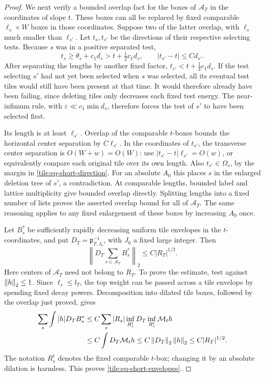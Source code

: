 \begin{proof}
We next verify a bounded overlap fact for the boxes of
\(\mathcal A_T\) in the coordinates of slope \(t\).  These
boxes can all be replaced by fixed comparable
\(\ell_s\times W\) boxes in those coordinates.  Suppose
two of the latter overlap, with \(\ell_s\) much smaller
than \(\ell_{s'}\).  Let \(t_s,t_{s'}\) be the directions
of their respective selecting tests.  Because \(s\) was
in a positive separated test,
\[
 t_s\geq\theta_s+c_1d_s>t+\tfrac12c_1d_s,
 \qquad
 |t_{s'}-t|\leq C d_{s'}.
\]
After separating the lengths by another fixed factor,
\(t_{s'}<t+\tfrac14c_1d_s\).  If the test selecting
\(s'\) had not yet been selected when \(s\) was selected,
all its eventual test tiles would still have been
present at that time.  It would therefore already
have been failing, since deleting tiles only
decreases each fixed test energy.
The near-infimum rule, with
\(\varepsilon\ll c_1\min d_s\), therefore forces the
test of \(s'\) to have been selected first.

Its length is at least \(\ell_{s'}\).  Overlap of the
comparable \(t\)-boxes bounds the horizontal center
separation by \(C\ell_{s'}\).  In the coordinates of
\(t_{s'}\), the transverse center separation is
\(O(W+w)=O(W)\): use
\(|t_{s'}-t|\ell_{s'}=O(w)\), or equivalently compare
each original tile over its own length.  Also
\(t_{s'}\in\Omega_s\), by the margin in
\eqref{tile:eq-short-direction}.  For an absolute
\(A_0\) this places \(s\) in the enlarged deletion tree
of \(s'\), a contradiction.  At comparable lengths,
bounded label and lattice multiplicity give bounded
overlap directly.  Splitting lengths into a fixed number
of lists proves the asserted overlap bound for all of
\(\mathcal A_T\).  The same reasoning applies to any
fixed enlargement of these boxes by increasing \(A_0\)
once.

Let \(B_s^*\) be sufficiently rapidly decreasing uniform
tile envelopes in the \(t\)-coordinates, and put
\(D_T=\mathfrak p_{T,J_0}^{-1}\), with \(J_0\) a fixed
large integer.  Then
\begin{equation}\label{tile:eq-short-envelopes}
 \left\|D_T\sum_{s\in\mathcal A_T}B_s^*\right\|_2
       \leq C|R_T|^{1/2}.
\end{equation}
Here centers of \(\mathcal A_T\) need not belong to
\(R_T\).  To prove the estimate, test against
\(\left\|h\right\|_2\leq1\).  Since \(\ell_s\leq l_T\), the
top weight can be passed across a tile envelope by
spending fixed decay powers.  Decomposition into dilated
tile boxes, followed by the overlap just proved, gives
\begin{align*}
 \sum_s\int |h|D_T B_s^*
 &\leq C\sum_s |R_s|
       \inf_{R_s^t}D_T\inf_{R_s^t}\mathcal M_t h\\
 &\leq C\int D_T\mathcal M_t h
 \leq C\left\|D_T\right\|_2\left\|h\right\|_2
 \leq C|R_T|^{1/2}.
\end{align*}
The notation \(R_s^t\) denotes the fixed comparable
\(t\)-box; changing it by an absolute dilation is
harmless.  This proves \eqref{tile:eq-short-envelopes}.


\end{proof}
